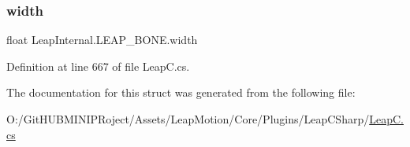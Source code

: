 \subsubsection{\texorpdfstring{width}{width}}
{\footnotesize\ttfamily float Leap\+Internal.\+L\+E\+A\+P\+\_\+\+B\+O\+N\+E.\+width}



Definition at line 667 of file Leap\+C.\+cs.



The documentation for this struct was generated from the following file\+:\begin{DoxyCompactItemize}
\item 
O\+:/\+Git\+H\+U\+B\+M\+I\+N\+I\+P\+Roject/\+Assets/\+Leap\+Motion/\+Core/\+Plugins/\+Leap\+C\+Sharp/\mbox{\hyperlink{_leap_c_8cs}{Leap\+C.\+cs}}\end{DoxyCompactItemize}
